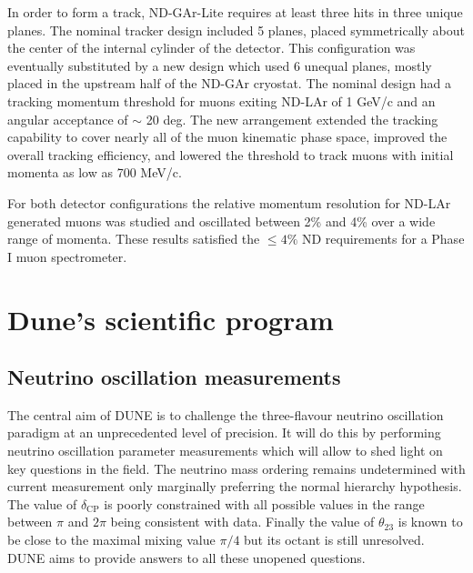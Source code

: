 
In order to form a track, ND-GAr-Lite requires at least three hits in three unique planes. The nominal tracker design included 5 planes, placed symmetrically about the center of the internal cylinder of the detector. This configuration was eventually substituted by a new design which used 6 unequal planes, mostly placed in the upstream half of the ND-GAr cryostat. The nominal design had a tracking momentum threshold for muons exiting ND-LAr of 1 GeV/c and an angular acceptance of $\sim$ 20 deg. The new arrangement extended the tracking capability to cover nearly all of the muon kinematic phase space, improved the overall tracking efficiency, and lowered the threshold to track muons with initial momenta as low as 700 MeV/c.

For both detector configurations the relative momentum resolution for ND-LAr generated muons was studied and oscillated between 2\% and 4\% over a wide range of momenta. These results satisfied the $\leq 4\%$ ND requirements for a Phase I muon spectrometer.  

\section{Dune's scientific program}
\subsection{Neutrino oscillation measurements}
The central aim of DUNE is to challenge the three-flavour neutrino oscillation paradigm at an unprecedented level of precision. It will do this by performing neutrino oscillation parameter measurements which will allow to shed light on key questions in the field. The neutrino mass ordering remains undetermined with current measurement only marginally preferring the normal hierarchy hypothesis.  The value of $\delta_\textrm{CP}$ is poorly constrained with all possible values in the range between $\pi$ and $2\pi$ being consistent with data. Finally the value of $\theta_{23}$ is known to be close to the maximal mixing value $\pi/4$ but its octant is still unresolved. DUNE aims to provide answers to all these unopened questions.

